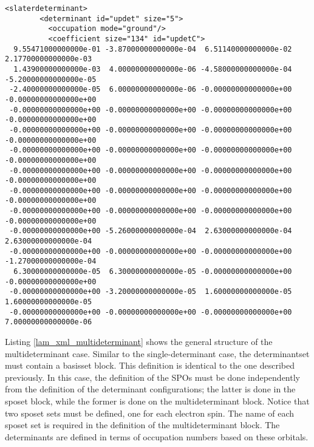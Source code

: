 \begin{lstlisting}[style=QMCPXML,caption=``Sample XML block for the single Slater determinant case.",label=lst:lam_xml_slaterdeterminant]
      <slaterdeterminant>
        <determinant id="updet" size="5">
          <occupation mode="ground"/>
          <coefficient size="134" id="updetC">
  9.55471000000000e-01 -3.87000000000000e-04  6.51140000000000e-02  2.17700000000000e-03
  1.43900000000000e-03  4.00000000000000e-06 -4.58000000000000e-04 -5.20000000000000e-05
 -2.40000000000000e-05  6.00000000000000e-06 -0.00000000000000e+00 -0.00000000000000e+00
 -0.00000000000000e+00 -0.00000000000000e+00 -0.00000000000000e+00 -0.00000000000000e+00
 -0.00000000000000e+00 -0.00000000000000e+00 -0.00000000000000e+00 -0.00000000000000e+00
 -0.00000000000000e+00 -0.00000000000000e+00 -0.00000000000000e+00 -0.00000000000000e+00
 -0.00000000000000e+00 -0.00000000000000e+00 -0.00000000000000e+00 -0.00000000000000e+00
 -0.00000000000000e+00 -0.00000000000000e+00 -0.00000000000000e+00 -0.00000000000000e+00
 -0.00000000000000e+00 -0.00000000000000e+00 -0.00000000000000e+00 -0.00000000000000e+00
 -0.00000000000000e+00 -5.26000000000000e-04  2.63000000000000e-04  2.63000000000000e-04
 -0.00000000000000e+00 -0.00000000000000e+00 -0.00000000000000e+00 -1.27000000000000e-04
  6.30000000000000e-05  6.30000000000000e-05 -0.00000000000000e+00 -0.00000000000000e+00
 -0.00000000000000e+00 -3.20000000000000e-05  1.60000000000000e-05  1.60000000000000e-05
 -0.00000000000000e+00 -0.00000000000000e+00 -0.00000000000000e+00  7.00000000000000e-06
\end{lstlisting}
Listing \ref{lam_xml_multideterminant} shows the general structure of the multideterminant case. 
Similar to the
single-determinant case, the determinantset must contain a basisset block. This definition is
identical to the one described previously. In this case, the definition of the SPOs
must be done independently from the definition of the determinant configurations; the latter
is done in the sposet block, while the former is done on the multideterminant block. Notice
that two sposet sets must be defined, one for each electron spin. The name of each sposet set
is required in the definition of the multideterminant block. The determinants are defined in
terms of occupation numbers based on these orbitals.

